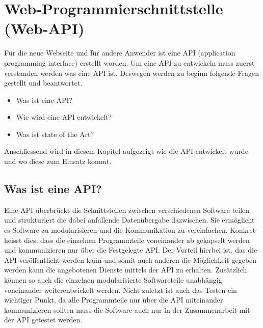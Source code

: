 
\section{ Web-Programmierschnittstelle (Web-API)}
Für die neue Webseite und für andere Anwender ist eine API (application programming interface) erstellt worden. Um eine API zu entwickeln muss zuerst verstanden werden was eine API ist. Deswegen werden zu beginn folgende Fragen gestellt und beantwortet.
\begin{itemize}
\item Was ist eine API?
\item Wie wird eine API entwickelt?
\item Was ist state of the Art?
\end{itemize}

Anschliessend wird in diesem Kapitel aufgezeigt wie die API entwickelt wurde und wo diese zum Einsatz kommt.

\subsection{Was ist eine API?}
Eine API überbrückt die Schnittstellen zwischen verschiedenen Software teilen und strukturiert die dabei anfallende Datenübergabe dazwischen. Sie ermöglicht es Software zu modularisieren und die Kommunikation zu vereinfachen. Konkret heisst dies, dass die einzelnen Programmteile  voneinander ab gekapselt werden und kommunizieren nur über die Festgelegte API. Der Vorteil hierbei ist, das die API veröffentlicht werden kann und somit auch anderen die Möglichkeit gegeben werden kann die angebotenen Dienste mittels der API zu erhalten. Zusätzlich können so auch die einzelnen modularisierte Softwareteile unabhängig voneinander weiterentwickelt werden. Nicht zuletzt ist auch das Testen ein wichtiger Punkt, da alle Programmteile nur über die API miteinander kommunizieren sollten muss die Software auch nur in der Zusammenarbeit mit der API getestet werden.

